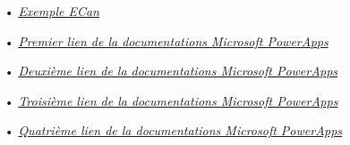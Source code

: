 \documentclass[a4paper]{report}
\begin{document}
\begin{doublespace}
	\begin{itemize}
		\item[•] \href{https://powerapps.microsoft.com/fr-fr/blog/environment-canterbury-speeds-up-outcome-tracking-with-the-power-platform/}{\textit{Exemple ECan}}
		\item[•] \href{https://emea01.safelinks.protection.outlook.com/?url=https%3A%2F%2Fdocs.microsoft.com%2Fen-us%2Fpowerapps%2Fmaker%2Fcanvas-apps%2F&data=04%7C01%7C%7Ce65e3af41e9e410f992a08d95cc734ff%7C84df9e7fe9f640afb435aaaaaaaaaaaa%7C1%7C0%7C637642832931864679%7CUnknown%7CTWFpbGZsb3d8eyJWIjoiMC4wLjAwMDAiLCJQIjoiV2luMzIiLCJBTiI6Ik1haWwiLCJXVCI6Mn0%3D%7C1000&sdata=ml2KrrKcMUPLsWsH8d7ZDjdeXtLx9S985dY5hgI1RJI%3D&reserved=0}{\textit{Premier lien de la documentations Microsoft PowerApps}}
		\item[•] \href{https://emea01.safelinks.protection.outlook.com/?url=https%3A%2F%2Fdocs.microsoft.com%2Fen-us%2Fpowerapps%2Fmaker%2Fcanvas-apps%2Fget-started-create-from-data&data=04%7C01%7C%7Ce65e3af41e9e410f992a08d95cc734ff%7C84df9e7fe9f640afb435aaaaaaaaaaaa%7C1%7C0%7C637642832931869656%7CUnknown%7CTWFpbGZsb3d8eyJWIjoiMC4wLjAwMDAiLCJQIjoiV2luMzIiLCJBTiI6Ik1haWwiLCJXVCI6Mn0%3D%7C1000&sdata=TYbRoGvzIzwO4PThp3yUtywRr76KLIIUmJqSSvyN8MY%3D&reserved=0}{\textit{Deuxième lien de la documentations Microsoft PowerApps}}
		\item[•] \href{https://emea01.safelinks.protection.outlook.com/?url=https%3A%2F%2Fdocs.microsoft.com%2Fen-us%2Fpowerapps%2Fmaker%2Fcanvas-apps%2Fadd-form&data=04%7C01%7C%7Ce65e3af41e9e410f992a08d95cc734ff%7C84df9e7fe9f640afb435aaaaaaaaaaaa%7C1%7C0%7C637642832931874635%7CUnknown%7CTWFpbGZsb3d8eyJWIjoiMC4wLjAwMDAiLCJQIjoiV2luMzIiLCJBTiI6Ik1haWwiLCJXVCI6Mn0%3D%7C1000&sdata=S8RfTDyJ%2F3ZvtP4lwqBSSMAWrbXd85oLdXiEkFO6LLQ%3D&reserved=0}{\textit{Troisième lien de la documentations Microsoft PowerApps}}
		\item[•] \href{https://emea01.safelinks.protection.outlook.com/?url=https%3A%2F%2Fdocs.microsoft.com%2Fen-us%2Fpowerapps%2Fmaker%2Fcanvas-apps%2Fdependent-drop-down-lists&data=04%7C01%7C%7Ce65e3af41e9e410f992a08d95cc734ff%7C84df9e7fe9f640afb435aaaaaaaaaaaa%7C1%7C0%7C637642832931879615%7CUnknown%7CTWFpbGZsb3d8eyJWIjoiMC4wLjAwMDAiLCJQIjoiV2luMzIiLCJBTiI6Ik1haWwiLCJXVCI6Mn0%3D%7C1000&sdata=x8uoZpDPhhwkV%2FJhJFVIo4NZwVNOUULsb9etpMMT%2Bio%3D&reserved=0}{\textit{Quatrième lien de la documentations Microsoft PowerApps}}
	\end{itemize}

\end{doublespace}
\end{document}
